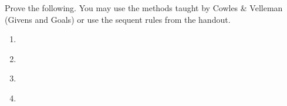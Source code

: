 \documentclass[11pt]{article}
\begin{document}

Prove the following.  You may use the methods taught by Cowles \&
Velleman (Givens and Goals) or use the sequent rules from the handout.

\goodbreak\noindent
\begin{enumerate}

\item{} \\

\item{} \\

\item{} \\

\item{} \\



\end{enumerate}
\end{document}
